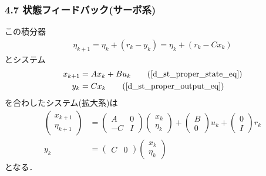 \begin{frame}[t]
\frametitle{4.7 状態フィードバック(サーボ系)}
\addtocounter{equation}{-1}
この積分器
\begin{align}
 \eta_{k+1} = \eta_k + (r_k - y_k) = \eta_k + (r_k - C x_k) 
\end{align}
とシステム
\begin{align}
   x_{k+1} &= A x_k + B u_k \tag{\ref{d_st_proper_state_eq}} \\
       y_k &= C x_k \tag{\ref{d_st_proper_output_eq}}
\end{align}
を合わしたシステム(拡大系)は
\begin{align}
 \left(\begin{array}{c}
	x_{k+1} \\
	\eta_{k+1}
       \end{array}\right)
 &=
 \left(\begin{array}{cc}
        A  & 0 \\
	-C & I
       \end{array}\right)
 \left(\begin{array}{c}
        x_k \\
	\eta_k
       \end{array}\right)
 +
 \left(\begin{array}{c}
	B \\
	0
       \end{array}\right)
 u_k +
 \left(\begin{array}{c}
        0 \\
	I
       \end{array}\right) 
 r_k \\
 y_k &=
  \left(\begin{array}{cc}
         C & 0 
	\end{array}\right)
  \left(\begin{array}{c}
         x_k \\
	 \eta_k
	\end{array}\right)
\end{align}
となる．
\end{frame}

